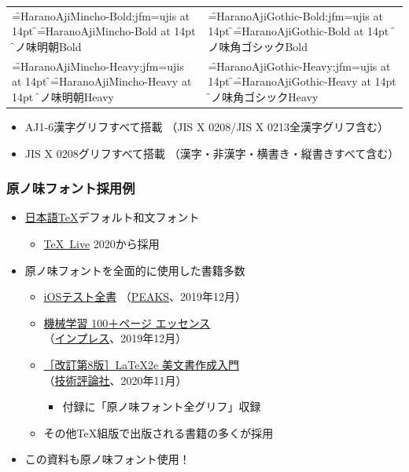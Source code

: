 \begin{frame}
\begin{tabular}{ll}
    \jfont\f=HaranoAjiMincho-Bold:jfm=ujis at 14pt \f
    \font\f=HaranoAjiMincho-Bold at 14pt \f
    原ノ味明朝Bold
    &
    \jfont\f=HaranoAjiGothic-Bold:jfm=ujis at 14pt \f
    \font\f=HaranoAjiGothic-Bold at 14pt \f
    原ノ味角ゴシックBold
    \\

    \jfont\f=HaranoAjiMincho-Heavy:jfm=ujis at 14pt \f
    \font\f=HaranoAjiMincho-Heavy at 14pt \f
    原ノ味明朝Heavy
    &
    \jfont\f=HaranoAjiGothic-Heavy:jfm=ujis at 14pt \f
    \font\f=HaranoAjiGothic-Heavy at 14pt \f
    原ノ味角ゴシックHeavy
  \end{tabular}

  \begin{itemize}
  \item \footnotesize AJ1-6漢字グリフすべて搭載
    {\tiny （JIS X 0208/JIS X 0213全漢字グリフ含む）}
  \item \footnotesize JIS X 0208グリフすべて搭載
    {\tiny （漢字・非漢字・横書き・縦書きすべて含む）}
  \end{itemize}
\end{frame}

\begin{frame}\frametitle{原ノ味フォント採用例}
  \begin{itemize}
  \item \small \href{https://texjp.org/}{日本語\TeX}デフォルト和文フォント \\
    \begin{itemize}
    \item \footnotesize
      \href{http://www.tug.org/texlive/}{\TeX ~Live} 2020から採用
    \end{itemize}
  \item \small 原ノ味フォントを全面的に使用した書籍多数
    \begin{itemize}
    \item \footnotesize\href{https://peaks.cc/books/iOS_testing}{%
      iOSテスト全書}
      （\href{https://peaks.cc/}{PEAKS}、2019年12月）
    \item \footnotesize\href{https://book.impress.co.jp/books/1119101016}{%
      機械学習 100＋ページ エッセンス} \\
      （\href{https://book.impress.co.jp/}{インプレス}、2019年12月）
    \item \footnotesize\href{https://gihyo.jp/book/2020/978-4-297-11712-2}{%
      ［改訂第8版］\LaTeX2e 美文書作成入門} \\
      （\href{https://gihyo.jp/book/}{技術評論社}、2020年11月）
      \begin{itemize}
      \item 付録に「原ノ味フォント全グリフ」収録
      \end{itemize}
    \item \footnotesize その他\TeX 組版で出版される書籍の多くが採用
    \end{itemize}
  \item \small この資料も原ノ味フォント使用！
  \end{itemize}
\end{frame}

